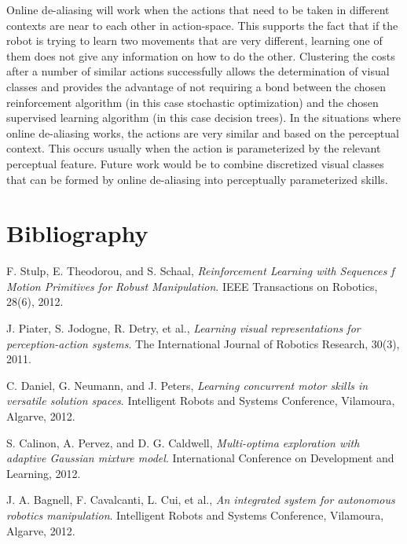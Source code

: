 \documentclass[12pt]{article}
\begin{document}
Online de-aliasing will work when the actions that need to be taken in different contexts are near to each other in action-space. This supports the fact that if the robot is trying to learn two movements that are very different, learning one of them does not give any information on how to do the other. Clustering the costs after a number of similar actions successfully allows the determination of visual classes and provides the advantage of not requiring a bond between the chosen reinforcement algorithm (in this case stochastic optimization) and the chosen supervised learning algorithm (in this case decision trees). In the situations where online de-aliasing works, the actions are very similar and based on the perceptual context. This occurs usually when the action is parameterized by the relevant perceptual feature. Future work would be to combine discretized visual classes that can be formed by online de-aliasing into perceptually parameterized skills.

\section{Bibliography}

\begin{thebibliography}{9}

  F. Stulp, E. Theodorou, and S. Schaal,
  \emph{Reinforcement Learning with Sequences f Motion Primitives for Robust Manipulation}.
  IEEE Transactions on Robotics, 
  28(6),
  2012.

  J. Piater, S. Jodogne, R. Detry, et al.,
  \emph{Learning visual representations for perception-action systems}.
  The International Journal of Robotics Research, 
  30(3),
  2011.
  
    C. Daniel, G. Neumann, and J. Peters,
    \emph{Learning concurrent motor skills in versatile solution spaces}.
    Intelligent Robots and Systems Conference, Vilamoura, Algarve,
    2012.
    
  S. Calinon, A. Pervez, and D. G. Caldwell,
  \emph{Multi-optima exploration with adaptive Gaussian mixture model}.
  International Conference on Development and Learning, 
  2012.
  
  
  J. A. Bagnell, F. Cavalcanti, L. Cui, et al.,
  \emph{An integrated system for autonomous robotics manipulation}.
  Intelligent Robots and Systems Conference, Vilamoura, Algarve, 
  2012.
  

\end{thebibliography}
\end{document}
